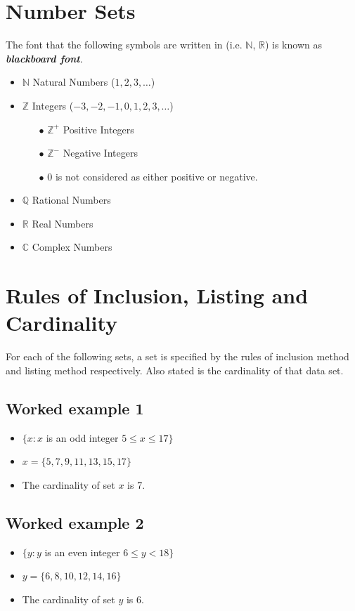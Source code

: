 \documentclass[]{report}
\begin{document}
\begin{enumerate}
\section*{Number Sets}
The font that the following symbols are written in (i.e. $\mathbb{N}$, $\mathbb{R}$) is known as \textit{\textbf{blackboard font}}.
\begin{itemize}
\item $\mathbb{N}$ Natural Numbers ($1,2,3,\ldots$) 
\item $\mathbb{Z}$ Integers ($-3,-2,-1,0,1,2,3, \ldots$)
\begin{itemize}
\item[$\bullet$] $\mathbb{Z}^{+}$ Positive Integers
\item[$\bullet$] $\mathbb{Z}^{-}$ Negative Integers
\item[$\bullet$] 0 is not considered as either positive or negative.
\end{itemize}
\item $\mathbb{Q}$ Rational Numbers
\item $\mathbb{R}$ Real Numbers
\item $\mathbb{C}$ Complex Numbers
\end{itemize}
\newpage
\section*{Rules of Inclusion, Listing and Cardinality}
For each of the following sets, a set is specified by the rules of inclusion method and listing method respectively. Also stated is the cardinality of that data set.
\subsection*{Worked example 1}
\begin{itemize}
\item $\{ x : x $ is an odd integer $ 5 \leq x \leq 17 \}$
\item $x = \{5,7,9,11,13,15,17\}$
\item The cardinality of set $x$ is 7.
\end{itemize}

\subsection*{Worked example 2}
\begin{itemize}
\item $\{ y : y $ is an even integer $ 6 \leq y < 18 \}$
\item $y = \{6,8,10,12,14,16\}$
\item The cardinality of set $y$ is 6.
\end{itemize}


\end{enumerate}
\end{document}
